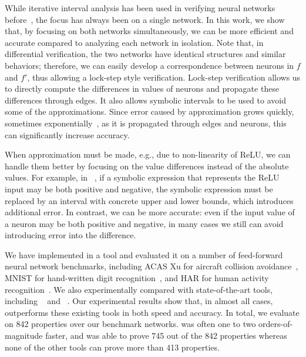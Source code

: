 While iterative interval analysis has been used in verifying neural
networks before~\cite{WangPWYJ18}, the focus has always been on a single network.  In
this work, we show that, by focusing on both networks simultaneously,
we can be more efficient and accurate compared to analyzing each
network in isolation.
%
Note that, in differential verification, the two networks have
identical structures and similar behaviors; therefore, we can easily
develop a correspondence between neurons in $ f $ and $ f' $, thus
allowing a lock-step style verification.  Lock-step verification
allows us to directly compute the differences in values of neurons and
propagate these differences through edges. It also allows symbolic
intervals to be used to avoid some of the approximations.
%
Since error caused by approximation grows quickly, sometimes
exponentially~\cite{WangPWYJ18nips}, as it is propagated through edges
and neurons, this can significantly increase accuracy.


When approximation must be made, e.g., due to non-linearity of ReLU,
we can handle them better by focusing on the value differences instead
of the absolute values.  For example, in \ReluVal{}~\cite{WangPWYJ18},
if a symbolic expression that represents the ReLU input may be both
positive and negative, the symbolic expression must be replaced by an
interval with concrete upper and lower bounds, which introduces
additional error.  In contrast, we can be more accurate: even if the
input value of a neuron may be both positive and negative, in many
cases we still can avoid introducing error into the difference.



We have implemented \diffNN{} in a tool and evaluated it on a number
of feed-forward neural network benchmarks, including ACAS Xu for
aircraft collision avoidance~\cite{JulianKO18}, MNIST for hand-written
digit recognition~\cite{LecunBBH98}, and HAR for human activity
recognition~\cite{AnguitaHAR}.  We also experimentally
compared \diffNN{} with state-of-the-art tools,
including \ReluVal{}~\cite{WangPWYJ18}
and \DeepPoly{}~\cite{SinghGPV19}.  Our experimental results show
that, in almost all cases, \diffNN{} outperforms these existing tools
in both speed and accuracy.
%
In total, we evaluate on 842 properties over our benchmark
networks. \diffNN{} was often one to two orders-of-magnitude faster,
and was able to prove 745 out of the 842 properties whereas none of
the other tools can prove more than 413 properties.



